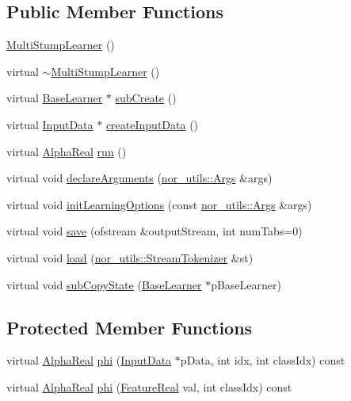\subsection*{Public Member Functions}
\begin{DoxyCompactItemize}
\item 
\hyperlink{classMultiBoost_1_1MultiStumpLearner_a640b74072333a3c523db636e916a9f50}{MultiStumpLearner} ()
\item 
virtual \hyperlink{classMultiBoost_1_1MultiStumpLearner_a2d64a523c1a2f76c6d788948c5914bd3}{$\sim$MultiStumpLearner} ()
\item 
virtual \hyperlink{classMultiBoost_1_1BaseLearner}{BaseLearner} $\ast$ \hyperlink{classMultiBoost_1_1MultiStumpLearner_a2a3c04efd1a250269a741ee83d11d988}{subCreate} ()
\item 
virtual \hyperlink{classMultiBoost_1_1InputData}{InputData} $\ast$ \hyperlink{classMultiBoost_1_1MultiStumpLearner_a62763cd19797a15161ef3134d7b8acc8}{createInputData} ()
\item 
virtual \hyperlink{Defaults_8h_a80184c4fd10ab70a1a17c5f97dcd1563}{AlphaReal} \hyperlink{classMultiBoost_1_1MultiStumpLearner_a682f5428b73db0e89de8128539108f6b}{run} ()
\item 
virtual void \hyperlink{classMultiBoost_1_1MultiStumpLearner_a61d17e2ac24c475f7d11e03abcb2e1de}{declareArguments} (\hyperlink{classnor__utils_1_1Args}{nor\_\-utils::Args} \&args)
\item 
virtual void \hyperlink{classMultiBoost_1_1MultiStumpLearner_a5fe30fa4df79be1937eae9341a96a320}{initLearningOptions} (const \hyperlink{classnor__utils_1_1Args}{nor\_\-utils::Args} \&args)
\item 
virtual void \hyperlink{classMultiBoost_1_1MultiStumpLearner_a1677eba09a926f5a27570506b117f3d1}{save} (ofstream \&outputStream, int numTabs=0)
\item 
virtual void \hyperlink{classMultiBoost_1_1MultiStumpLearner_a5fea1fcb77fb6372ee4ed57fcfa8867b}{load} (\hyperlink{classnor__utils_1_1StreamTokenizer}{nor\_\-utils::StreamTokenizer} \&st)
\item 
virtual void \hyperlink{classMultiBoost_1_1MultiStumpLearner_a261fe1a54a6032f23759c4287afe39e3}{subCopyState} (\hyperlink{classMultiBoost_1_1BaseLearner}{BaseLearner} $\ast$pBaseLearner)
\end{DoxyCompactItemize}
\subsection*{Protected Member Functions}
\begin{DoxyCompactItemize}
\item 
virtual \hyperlink{Defaults_8h_a80184c4fd10ab70a1a17c5f97dcd1563}{AlphaReal} \hyperlink{classMultiBoost_1_1MultiStumpLearner_a5ccf4057af3064e833ae8da920e29d42}{phi} (\hyperlink{classMultiBoost_1_1InputData}{InputData} $\ast$pData, int idx, int classIdx) const 
\item 
virtual \hyperlink{Defaults_8h_a80184c4fd10ab70a1a17c5f97dcd1563}{AlphaReal} \hyperlink{classMultiBoost_1_1MultiStumpLearner_aec2e42f65f07886a4c3969d1d79f0c18}{phi} (\hyperlink{Defaults_8h_a3a11cfe6a5d469d921716ca6291e934f}{FeatureReal} val, int classIdx) const 
\end{DoxyCompactItemize}
